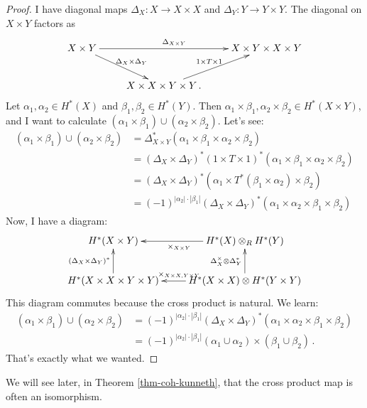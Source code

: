 \begin{proof}
I have diagonal maps $\Delta_X:X\to X\times X$ and $\Delta_Y:Y\to Y\times Y$. 
The diagonal on $X\times Y$ factors as
\[
\xymatrix{
X\times Y \ar[rr]^{\Delta_{X\times Y}} \ar[dr]^{\Delta_X\times\Delta_Y} &&
X\times Y\times X\times Y \\
& X\times X\times Y\times Y \ar[ur]^{1\times T\times1}\,.
}\]
Let $\alpha_1,\alpha_2\in H^\ast(X)$ and $\beta_1,\beta_2\in H^\ast(Y)$. Then $\alpha_1\times \beta_1,\alpha_2\times\beta_2\in H^\ast(X\times Y)$, and I want to calculate $(\alpha_1\times\beta_1)\cup(\alpha_2\times\beta_2)$. Let's see:
\begin{align*}
(\alpha_1\times\beta_1)\cup(\alpha_2\times\beta_2) & = \Delta_{X\times Y}^\ast(\alpha_1\times\beta_1\times\alpha_2\times\beta_2)\\
& = (\Delta_X\times\Delta_Y)^\ast(1\times T\times 1)^\ast(\alpha_1\times\beta_1\times\alpha_2\times\beta_2)\\
& = (\Delta_X\times\Delta_Y)^\ast(\alpha_1\times T^\ast(\beta_1\times\alpha_2)\times\beta_2)\\
& = (-1)^{|\alpha_2|\cdot|\beta_1|}(\Delta_X\times\Delta_Y)^\ast(\alpha_1\times\alpha_2\times\beta_1\times\beta_2)
\end{align*}
Now, I have a diagram:
\begin{equation*}
\xymatrix{
	 H^\ast(X\times Y) & \ar[l]^{\times_{X\times Y}} H^\ast(X)\otimes_R H^\ast(Y)\\
	 H^\ast(X\times X\times Y\times Y)\ar[u]^{(\Delta_X\times\Delta_Y)^\ast} & H^\ast(X\times X)\otimes H^\ast(Y\times Y)\ar[l]_{\times_{X\times X,Y\times Y}}\ar[u]^{\Delta_X^\times\otimes\Delta_Y^\ast}
}
\end{equation*}
This diagram commutes because the cross product is natural. We learn:
\begin{align*}
(\alpha_1\times\beta_1)\cup(\alpha_2\times\beta_2) & = (-1)^{|\alpha_2|\cdot|\beta_1|}(\Delta_X\times\Delta_Y)^\ast(\alpha_1\times\alpha_2\times\beta_1\times\beta_2)\\
& = (-1)^{|\alpha_2|\cdot|\beta_1|}(\alpha_1\cup\alpha_2)\times(\beta_1\cup\beta_2)\,.
\end{align*}
That's exactly what we wanted.
\end{proof}
We will see later, in Theorem \ref{thm-coh-kunneth}, that the cross product
map is often an isomorphism. 

